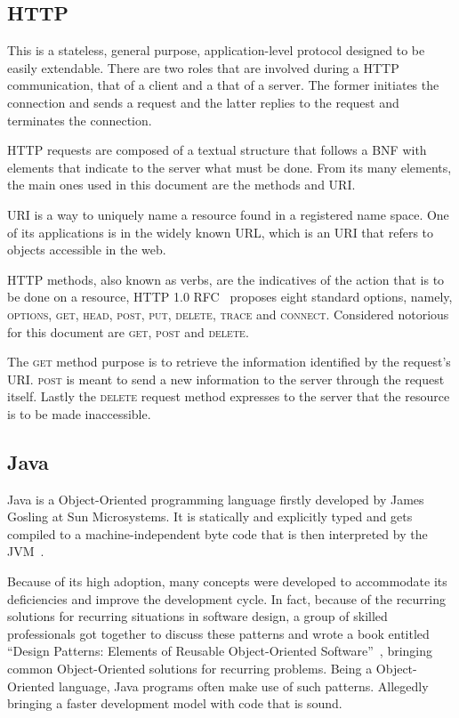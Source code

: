 \subsection{HTTP}
This is a stateless, general purpose, application-level protocol designed to be easily extendable. There are two roles that are involved during a \gls{HTTP} communication, that of a client and a that of a server. The former initiates the connection and sends a request and the latter replies to the request and terminates the connection.

\gls{HTTP} requests are composed of a textual structure that follows a \gls{BNF} with elements that indicate to the server what must be done. From its many elements, the main ones used in this document are the methods and \gls{URI}.

\gls{URI} is a way to uniquely name a resource found in a registered name space. One of its applications is in the widely known \gls{URL}, which is an \gls{URI} that refers to objects accessible in the web.

\gls{HTTP} methods, also known as verbs, are the indicatives of the action that is to be done on a resource, \gls{HTTP} 1.0 \gls{RFC}~\cite{http} proposes eight standard options, namely, \textsc{options}, \textsc{get}, \textsc{head}, \textsc{post}, \textsc{put}, \textsc{delete}, \textsc{trace} and \textsc{connect}. Considered notorious for this document are \textsc{get}, \textsc{post} and \textsc{delete}.

The \textsc{get} method purpose is to retrieve the information identified by the request's \gls{URI}. \textsc{post} is meant to send a new information to the server through the request itself. Lastly the \textsc{delete} request method expresses to the server that the resource is to be made inaccessible.

\subsection{Java}
Java is a Object-Oriented programming language firstly developed by James Gosling at Sun Microsystems. It is statically and explicitly typed and gets compiled to a machine-independent byte code that is then interpreted by the \gls{JVM}~\cite{java}.

Because of its high adoption, many concepts were developed to accommodate its deficiencies and improve the development cycle. In fact, because of the recurring solutions for recurring situations in software design, a group of skilled professionals got together to discuss these patterns and wrote a book entitled ``Design Patterns: Elements of Reusable Object-Oriented Software''~\cite{patterns}, bringing common Object-Oriented solutions for recurring problems. Being a Object-Oriented language, Java programs often make use of such patterns. Allegedly bringing a faster development model with code that is sound.

